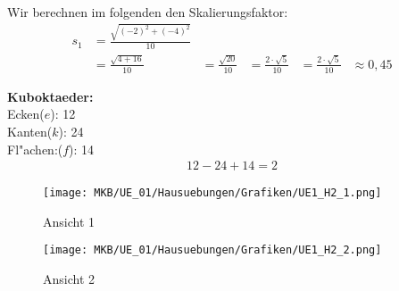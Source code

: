 %
\begin{Loesung}
\begin{Teilloesungen}

\item Wir berechnen im folgenden den Skalierungsfaktor:
\begin{align*}
s_1 &= \frac{\sqrt{(-2)^{2}+(-4)^{2}}}{10}\\
&= \frac{\sqrt{4+16}}{10}
&= \frac{\sqrt{20}}{10}
&= \frac{2 \cdot \sqrt{5}}{10}
&= \frac{2 \cdot \sqrt{5}}{10}
&\approx 0,45
\end{align*}

\item \textbf{Kuboktaeder:} \\
Ecken($e$): 12\\
Kanten($k$): 24\\
Fl"achen:($f$): 14\\
\abc %
\begin{align*}
12 - 24 + 14 = 2
\end{align*}

\item \begin{figure}[H]
	\centering
	\texttt{[image: MKB/UE\_01/Hausuebungen/Grafiken/UE1\_H2\_1.png]}
	\caption{Ansicht 1}
	\label{fig:H2_1}
\end{figure}

\begin{figure}[H]
	\centering
	\texttt{[image: MKB/UE\_01/Hausuebungen/Grafiken/UE1\_H2\_2.png]}
	\caption{Ansicht 2}
	\label{fig:H2_2}
\end{figure}

\end{Teilloesungen}
\end{Loesung}
%
